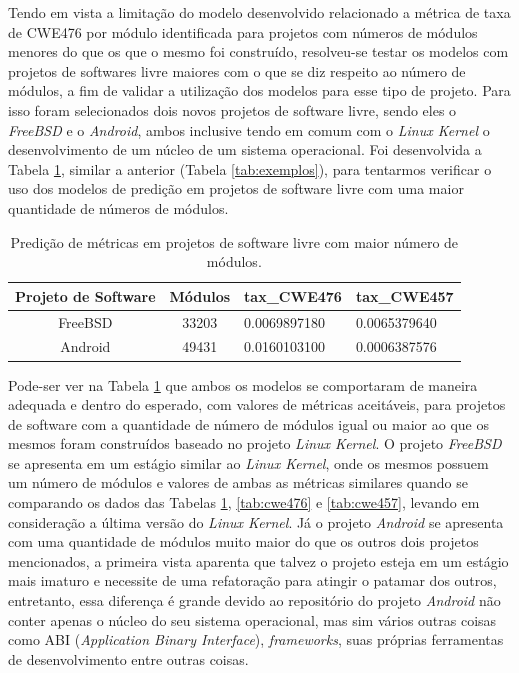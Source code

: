 Tendo em vista a limitação do modelo desenvolvido relacionado a métrica de taxa
de CWE476 por módulo identificada para projetos com números de módulos menores
do que os que o mesmo foi construído, resolveu-se testar os modelos com projetos
de softwares livre maiores com o que se diz respeito ao número de módulos, a fim
de validar a utilização dos modelos para esse tipo de projeto. Para isso foram
selecionados dois novos projetos de software livre, sendo eles o
\textit{FreeBSD} e o \textit{Android}, ambos inclusive tendo em comum com o
\textit{Linux Kernel} o desenvolvimento de um núcleo de um sistema operacional.
Foi desenvolvida a Tabela \ref{tab:exemplos2}, similar a anterior (Tabela
\ref{tab:exemplos}), para tentarmos verificar o uso dos modelos de predição em
projetos de software livre com uma maior quantidade de números de módulos.

\begin{table}[h]
 \centering
 \begin{tabular}{ccll}
  \hline
  \rowcolor[HTML]{EFEFEF} 
  Projeto de Software & Módulos &
  \multicolumn{1}{c}{\cellcolor[HTML]{EFEFEF}tax\_CWE476} &
  \multicolumn{1}{c}{\cellcolor[HTML]{EFEFEF}tax\_CWE457} \\ \hline
  FreeBSD             & 33203   & 0.0069897180
  & 0.0065379640                                           \\ \hline
  Android             & 49431   & 0.0160103100
  & 0.0006387576                                          \\ \hline
 \end{tabular}
 \caption{Predição de métricas em projetos de software livre com maior número
 de módulos.}
 \label{tab:exemplos2}
\end{table}

Pode-ser ver na Tabela \ref{tab:exemplos2} que ambos os modelos se comportaram
de maneira adequada e dentro do esperado, com valores de métricas aceitáveis,
para projetos de software com a quantidade de número de módulos igual ou maior
ao que os mesmos foram construídos baseado no projeto \textit{Linux Kernel}. O
projeto \textit{FreeBSD} se apresenta em um estágio similar ao \textit{Linux
Kernel}, onde os mesmos possuem um número de módulos e valores de ambas as
métricas similares quando se comparando os dados das Tabelas
\ref{tab:exemplos2}, \ref{tab:cwe476} e \ref{tab:cwe457}, levando em
consideração a última versão do \textit{Linux Kernel}. Já o projeto
\textit{Android} se apresenta com uma quantidade de módulos muito maior do que
os outros dois projetos mencionados, a primeira vista aparenta que talvez o
projeto esteja em um estágio mais imaturo e necessite de uma refatoração para
atingir o patamar dos outros, entretanto, essa diferença é grande devido ao
repositório do projeto \textit{Android} não conter apenas o núcleo do seu
sistema operacional, mas sim vários outras coisas como ABI (\textit{Application
Binary Interface}), \textit{frameworks}, suas próprias ferramentas de
desenvolvimento entre outras coisas. 

